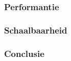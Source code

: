 \subsubsection{Performantie}

\subsubsection{Schaalbaarheid}

\subsubsection{Conclusie}






















